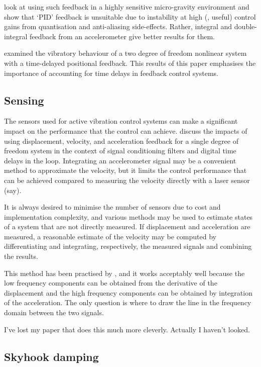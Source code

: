 \textcite{zhu2006} look at using such feedback in a highly sensitive
micro-gravity environment and show that `PID' feedback is unsuitable due to
instability at high (\ie, useful) control gains from quantisation and
anti-aliasing side-effects. Rather, integral and double-integral feedback from
an accelerometer give better results for them.

\textcite{zhao2007} examined the vibratory behaviour of a two degree of
freedom nonlinear system with a time-delayed positional feedback. This results
of this paper emphasises the importance of accounting for time delays in
feedback control systems.

\subsection{Sensing}

The sensors used for active vibration control systems can make a
significant impact on the performance that the control can
achieve. \textcite{brennan2007} discuss the impacts of using
displacement, velocity, and acceleration feedback for a single degree
of freedom system in the context of signal conditioning filters and
digital time delays in the loop. Integrating an accelerometer signal
may be a convenient method to approximate the velocity, but it limits
the control performance that can be achieved compared to measuring the
velocity directly with a laser sensor (say).

It is always desired to minimise the number of sensors due to cost and
implementation complexity, and various methods may be used to estimate
states of a system that are not directly measured. If displacement and
acceleration are measured, a reasonable estimate of the velocity may
be computed by differentiating and integrating, respectively, the
measured signals and combining the results.

This method has been practised by \textcite{bennett2007}, and it works
acceptably well because the low frequency components can be obtained
from the derivative of the displacement and the high frequency
components can be obtained by integration of the acceleration. The
only question is where to draw the line in the frequency domain
between the two signals.

I've lost my paper that does this much more cleverly. Actually I haven't looked.


\subsection{Skyhook damping}

